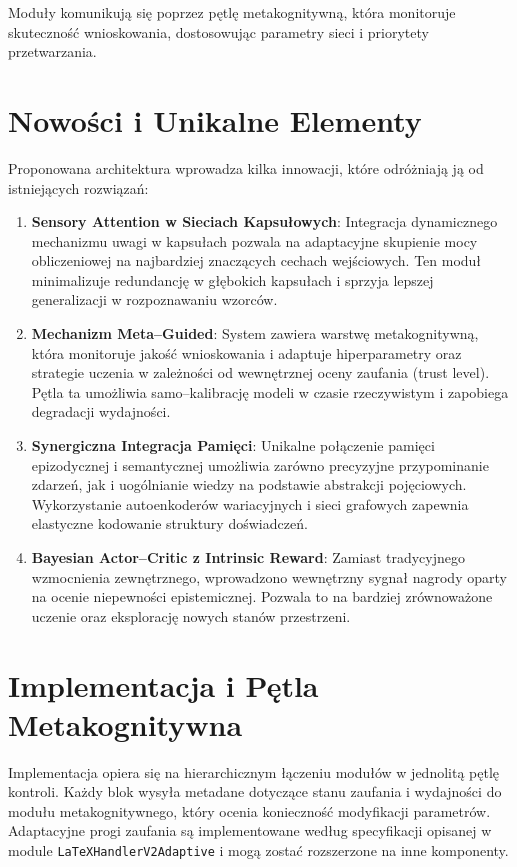 \documentclass[12pt,a4paper]{article}
\begin{document}
Moduły komunikują się poprzez pętlę metakognitywną, która monitoruje skuteczność wnioskowania, dostosowując parametry sieci i priorytety przetwarzania.

\section{Nowości i Unikalne Elementy}
Proponowana architektura wprowadza kilka innowacji, które odróżniają ją od istniejących rozwiązań:

\begin{enumerate}
  \item \textbf{Sensory Attention w Sieciach Kapsułowych}: Integracja dynamicznego mechanizmu uwagi w kapsułach pozwala na adaptacyjne skupienie mocy obliczeniowej na najbardziej znaczących cechach wejściowych. Ten moduł minimalizuje redundancję w głębokich kapsułach i sprzyja lepszej generalizacji w rozpoznawaniu wzorców.
  \item \textbf{Mechanizm Meta–Guided}: System zawiera warstwę metakognitywną, która monitoruje jakość wnioskowania i adaptuje hiperparametry oraz strategie uczenia w zależności od wewnętrznej oceny zaufania (trust level). Pętla ta umożliwia samo–kalibrację modeli w czasie rzeczywistym i zapobiega degradacji wydajności.
  \item \textbf{Synergiczna Integracja Pamięci}: Unikalne połączenie pamięci epizodycznej i semantycznej umożliwia zarówno precyzyjne przypominanie zdarzeń, jak i uogólnianie wiedzy na podstawie abstrakcji pojęciowych. Wykorzystanie autoenkoderów wariacyjnych i sieci grafowych zapewnia elastyczne kodowanie struktury doświadczeń.
  \item \textbf{Bayesian Actor–Critic z Intrinsic Reward}: Zamiast tradycyjnego wzmocnienia zewnętrznego, wprowadzono wewnętrzny sygnał nagrody oparty na ocenie niepewności epistemicznej. Pozwala to na bardziej zrównoważone uczenie oraz eksplorację nowych stanów przestrzeni.
\end{enumerate}

\section{Implementacja i Pętla Metakognitywna}
Implementacja opiera się na hierarchicznym łączeniu modułów w jednolitą pętlę kontroli. Każdy blok wysyła metadane dotyczące stanu zaufania i wydajności do modułu metakognitywnego, który ocenia konieczność modyfikacji parametrów. Adaptacyjne progi zaufania są implementowane według specyfikacji opisanej w module \texttt{LaTeXHandlerV2Adaptive} i mogą zostać rozszerzone na inne komponenty.
\end{document}
